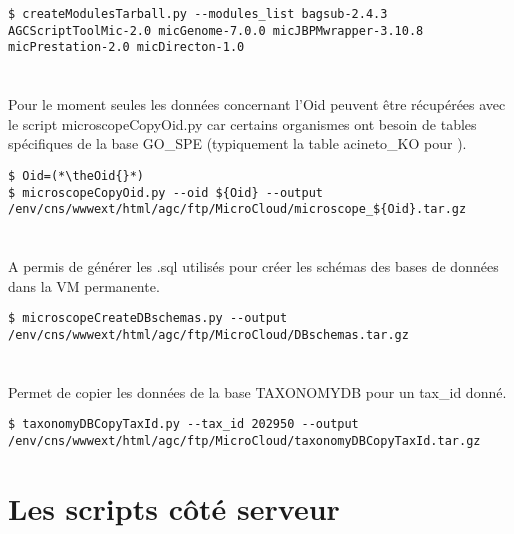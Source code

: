 \begin{lstlisting}[style=bash]
$ createModulesTarball.py --modules_list bagsub-2.4.3 AGCScriptToolMic-2.0 micGenome-7.0.0 micJBPMwrapper-3.10.8 micPrestation-2.0 micDirecton-1.0
\end{lstlisting}

\section{}

\begin{mycolorbox}
    Pour le moment seules les données concernant l'Oid \theOid{} peuvent être récupérées avec le script microscopeCopyOid.py car certains organismes ont besoin de tables spécifiques de la base GO\_SPE (typiquement la table acineto\_KO pour \theOrg{}).
\end{mycolorbox}

\begin{lstlisting}[style=bash]
$ Oid=(*\theOid{}*)
$ microscopeCopyOid.py --oid ${Oid} --output /env/cns/wwwext/html/agc/ftp/MicroCloud/microscope_${Oid}.tar.gz
\end{lstlisting}

\section{}
A permis de générer les .sql utilisés pour créer les schémas des bases de données dans la VM permanente.

\begin{lstlisting}[style=bash]
$ microscopeCreateDBschemas.py --output /env/cns/wwwext/html/agc/ftp/MicroCloud/DBschemas.tar.gz
\end{lstlisting}

\section{}
Permet de copier les données de la base TAXONOMYDB pour un tax\_id donné.

\begin{lstlisting}[style=bash]
$ taxonomyDBCopyTaxId.py --tax_id 202950 --output /env/cns/wwwext/html/agc/ftp/MicroCloud/taxonomyDBCopyTaxId.tar.gz
\end{lstlisting}

\section{Les scripts côté serveur}

